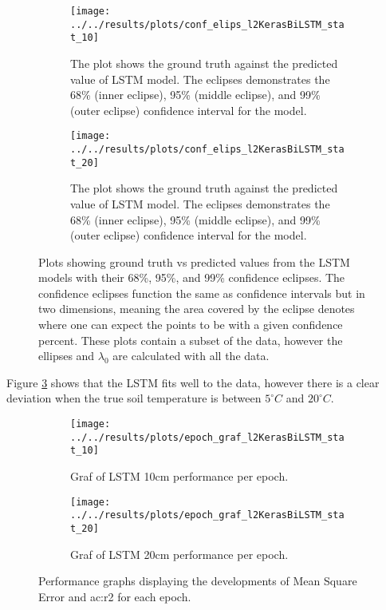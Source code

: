 \begin{figure}
	\begin{subfigure}{0.45\linewidth}
		\centering
		\texttt{[image: ../../results/plots/conf\_elips\_l2KerasBiLSTM\_stat\_10]}
		\caption[Confidence eclipse of LSTM model 10cm]{The plot shows the ground truth against the predicted value of LSTM model. The eclipses demonstrates the 68\% (inner eclipse), 95\% (middle eclipse), and 99\% (outer eclipse) confidence interval for the model.}
		\label{fig:confelipsl2KerasBiLSTMstat10}
	\end{subfigure}
	\hfill
	\begin{subfigure}{0.45\textwidth}
		\centering
		\texttt{[image: ../../results/plots/conf\_elips\_l2KerasBiLSTM\_stat\_20]}
		\caption[Confidence eclipse of LSTM model 20cm]{The plot shows the ground truth against the predicted value of LSTM model. The eclipses demonstrates the 68\% (inner eclipse), 95\% (middle eclipse), and 99\% (outer eclipse) confidence interval for the model.}
		\label{fig:confelipsl2KerasBiLSTMstat20}
	\end{subfigure}
	\caption{Plots showing ground truth vs predicted values from the LSTM models with their 68\%, 95\%, and 99\% confidence eclipses. The confidence eclipses function the same as confidence intervals but in two dimensions, meaning the area covered by the eclipse denotes where one can expect the points to be with a given confidence percent. These plots contain a subset of the data, however the ellipses and $\lambda_0$ are calculated with all the data.}
	\label{fig:LSTM:eclipse}
\end{figure}

Figure \ref{fig:LSTM:eclipse} shows that the LSTM fits well to the data, however there is a clear deviation when the true soil temperature is between $5^\circ C$ and $20^\circ C$.

\begin{figure}
	\begin{subfigure}{0.45\textwidth}
		\centering
		\begin{adjustwidth}{-1in}{-1in}
			\texttt{[image: ../../results/plots/epoch\_graf\_l2KerasBiLSTM\_stat\_10]}
		\end{adjustwidth}
		\caption[Epoch graph LSTM 10cm]{Graf of LSTM 10cm performance per epoch.}
		\label{fig:epochgrafl2KerasBiLSTMstat10}
	\end{subfigure}
	\begin{subfigure}{0.45\textwidth}
		\centering
		\begin{adjustwidth}{-1in}{-1in}
			\texttt{[image: ../../results/plots/epoch\_graf\_l2KerasBiLSTM\_stat\_20]}
		\end{adjustwidth}
		\caption[Epoch graph LSTM 20cm]{Graf of LSTM 20cm performance per epoch.}
		\label{fig:epochgrafl2KerasBiLSTMstat20}
	\end{subfigure}
	\caption{Performance graphs displaying the developments of Mean Square Error and \acrfull{ac:r2} for each epoch.}
	\label{fig:lstm:epoch:performance}
\end{figure}

